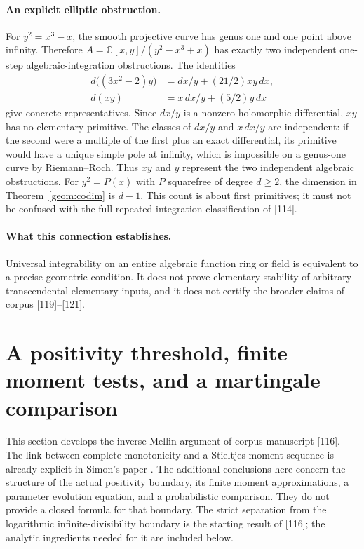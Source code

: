 \documentclass[11pt,a4paper]{article}
\theoremstyle{definition}
\theoremstyle{remark}
\numberwithin{equation}{section}
\begin{document}
\paragraph{An explicit elliptic obstruction.}
For $y^2=x^3-x$, the smooth projective curve has genus one and one
point above infinity. Therefore $A=\mathbb C[x,y]/(y^2-x^3+x)$ has
exactly two independent one-step algebraic-integration obstructions.
The identities
\begin{align*}
 d\bigl((3x^2-2)y\bigr)&=dx/y+(21/2)xy\,dx,\\
 d(xy)&=x\,dx/y+(5/2)y\,dx
\end{align*}
give concrete representatives. Since $dx/y$ is a nonzero holomorphic
differential, $xy$ has no elementary primitive. The classes of $dx/y$
and $x\,dx/y$ are independent: if the
second were a multiple of the first plus an exact differential, its
primitive would have a unique simple pole at infinity, which is
impossible on a genus-one curve by Riemann--Roch. Thus $xy$ and $y$
represent the two independent algebraic obstructions. For
$y^2=P(x)$ with $P$ squarefree of degree $d\ge2$, the dimension in
Theorem~\ref{geom:codim} is $d-1$. This count is about first primitives;
it must not be confused with the full repeated-integration
classification of [114].

\paragraph{What this connection establishes.}
Universal integrability on an entire algebraic function ring or field
is equivalent to a precise geometric condition. It does not prove
elementary stability of arbitrary transcendental elementary inputs,
and it does not certify the broader claims of corpus [119]--[121].


\section{A positivity threshold, finite moment tests, and a martingale comparison}
\label{spec:section}

This section develops the inverse-Mellin argument of corpus manuscript
[116].  The link between complete monotonicity and a Stieltjes moment
sequence is already explicit in Simon's paper \cite[Section~3]{Simon2021}.
The additional conclusions here concern the structure of the actual
positivity boundary, its finite moment approximations, a parameter
evolution equation, and a probabilistic comparison.  They do not provide
a closed formula for that boundary.  The strict separation from the
logarithmic infinite-divisibility boundary is the starting result of
[116]; the analytic ingredients needed for it are included below.
\end{document}
